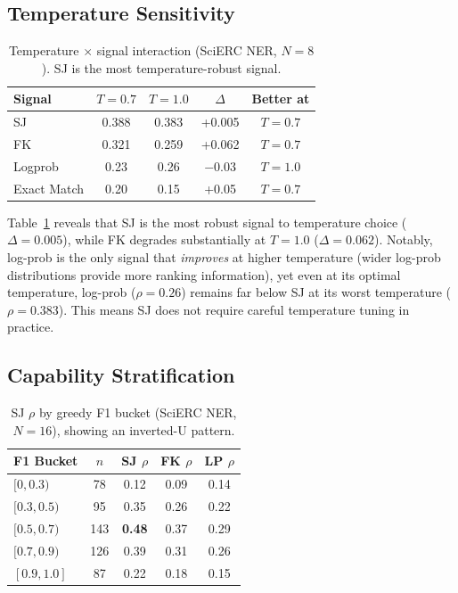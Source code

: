 \documentclass[11pt,a4paper]{article}
\begin{document}
\subsection{Temperature Sensitivity}
\label{sec:temperature}

\begin{table}[t]
\centering
\small
\caption{Temperature $\times$ signal interaction (SciERC NER, $N{=}8$). SJ is the most temperature-robust signal.}
\label{tab:temp}
\begin{tabular}{lcccc}
\toprule
\textbf{Signal} & $T{=}0.7$ & $T{=}1.0$ & $\Delta$ & \textbf{Better at} \\
\midrule
SJ & 0.388 & 0.383 & +0.005 & $T{=}0.7$ \\
FK & 0.321 & 0.259 & +0.062 & $T{=}0.7$ \\
Logprob & 0.23 & 0.26 & $-$0.03 & $T{=}1.0$ \\
Exact Match & 0.20 & 0.15 & +0.05 & $T{=}0.7$ \\
\bottomrule
\end{tabular}
\end{table}

Table~\ref{tab:temp} reveals that SJ is the most robust signal to temperature choice ($\Delta{=}0.005$), while FK degrades substantially at $T{=}1.0$ ($\Delta{=}0.062$). Notably, log-prob is the only signal that \emph{improves} at higher temperature (wider log-prob distributions provide more ranking information), yet even at its optimal temperature, log-prob ($\rho{=}0.26$) remains far below SJ at its worst temperature ($\rho{=}0.383$). This means SJ does not require careful temperature tuning in practice.

\subsection{Capability Stratification}
\label{sec:stratification}

\begin{table}[t]
\centering
\small
\caption{SJ $\rho$ by greedy F1 bucket (SciERC NER, $N{=}16$), showing an inverted-U pattern.}
\label{tab:strat}
\begin{tabular}{lcccc}
\toprule
\textbf{F1 Bucket} & $n$ & \textbf{SJ $\rho$} & \textbf{FK $\rho$} & \textbf{LP $\rho$} \\
\midrule
$[0, 0.3)$ & 78 & 0.12 & 0.09 & 0.14 \\
$[0.3, 0.5)$ & 95 & 0.35 & 0.26 & 0.22 \\
$[0.5, 0.7)$ & 143 & \textbf{0.48} & 0.37 & 0.29 \\
$[0.7, 0.9)$ & 126 & 0.39 & 0.31 & 0.26 \\
$[0.9, 1.0]$ & 87 & 0.22 & 0.18 & 0.15 \\
\bottomrule
\end{tabular}
\end{table}
\end{document}
